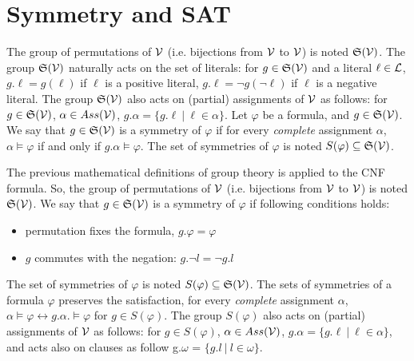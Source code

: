 \chapter{Symmetry and SAT}\label{chap:symmetryinsat}



The group of permutations of $\mathcal{V}$ (i.e. bijections from $\mathcal{V}$ to $\mathcal{V}$) is noted
$\mathfrak{S}(\mathcal{V})$. The group $\mathfrak{S}(\mathcal{V})$ naturally acts on the set of literals: for $g
\in \mathfrak{S}(\mathcal{V})$ and a literal $\ell \in \mathcal{L} $, $g.\ell = g(\ell)$ if $\ell$ is a
positive literal, $g.\ell = \neg g(\neg \ell)$ if $\ell$ is a negative literal.
The group $\mathfrak{S}(\mathcal{V})$ also acts on (partial) assignments of $\mathcal{V}$ as follows: for
$g \in \mathfrak{S}(\mathcal{V})$, $\alpha \in Ass(\mathcal{V})$, $g.\alpha = \{ g.\ell ~|~ \ell \in \alpha \}$. Let $\varphi$ be a formula, and $g \in \mathfrak{S}(\mathcal{V})$. We say that $g\in \mathfrak{S}(\mathcal{V})$ is a
symmetry of $ \varphi$ if for every \emph{complete} assignment $\alpha$, $\alpha
\models \varphi$ if and only if $g.\alpha \models \varphi$. The set of symmetries
of $\varphi$ is noted $S(\varphi) \subseteq \mathfrak{S}(\mathcal{V})$.



The previous mathematical definitions of group theory is applied to the CNF formula.
So, the group of permutations of $\mathcal{V}$ (i.e. bijections from $\mathcal{V}$ to $\mathcal{V}$) is noted
$\mathfrak{S}(\mathcal{V})$. We say that $g\in \mathfrak{S}(\mathcal{V})$ is a symmetry of $ \varphi$ if following conditions holds:
\vspace{-1em}
\begin{itemize}[topsep=1em]
	\item permutation fixes the formula, $g.\varphi =  \varphi$ 
	\item $g$  commutes with the negation: $g.\neg l  = \neg g.l$
\end{itemize}

The set of symmetries of $\varphi$ is noted $S(\varphi) \subseteq \mathfrak{S}(\mathcal{V})$.
The sets of symmetries of a formula $\varphi$ preserves the satisfaction,
for every \emph{complete} assignment $\alpha$, 
$\alpha \models \varphi \leftrightarrow g.\alpha. \models \varphi$ for $g \in S(\varphi)$.
The group $S(\varphi)$ also acts on (partial) assignments of $\mathcal{V}$ as follows: for
$g \in S(\varphi)$, $\alpha \in Ass(\mathcal{V})$, $g.\alpha = \{ g.\ell ~|~ \ell \in \alpha \}$,
and acts also on clauses as follow g.$\omega$ = $\{g.l ~|~ l \in \omega \}$.


